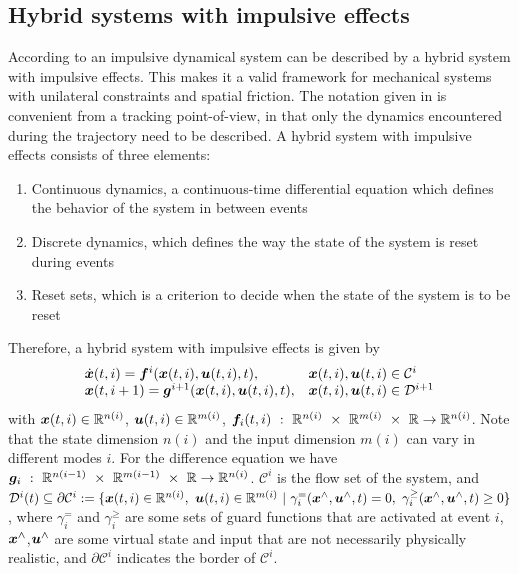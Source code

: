 \documentclass[../DC2017114Bouma.tex]{subfiles}
\begin{document}
%
\subsection{Hybrid systems with impulsive effects}\label{sec:2hyb}
According to \cite{Haddad2006} an impulsive dynamical system can be described by a hybrid system with impulsive effects. This makes it a valid framework for mechanical systems with unilateral constraints and spatial friction. The notation given in \cite{Haddad2006} is convenient from a tracking point-of-view, in that only the dynamics encountered during the trajectory need to be described. A hybrid system with impulsive effects consists of three elements:
\begin{enumerate}
\item Continuous dynamics, a continuous-time differential equation which defines the behavior of the system in between events
\item Discrete dynamics, which defines the way the state of the system is reset during events
\item Reset sets, which is a criterion to decide when the state of the system is to be reset
\end{enumerate}

Therefore, a hybrid system with impulsive effects is given by
\begin{equation}
\begin{array}{ll}
\dot{{\boldsymbol{x}}}(t,i) ={\boldsymbol{f}}^i({\boldsymbol{x}}(t,i),{\boldsymbol{u}}(t,i),t),& {\boldsymbol{x}}(t,i),{\boldsymbol{u}}(t,i)\in \mathcal{C}^i\\
{\boldsymbol{x}}(t,i+1) = {\boldsymbol{g}}^{i+1}({\boldsymbol{x}}(t,i),{\boldsymbol{u}}(t,i),t),& {\boldsymbol{x}}(t,i),{\boldsymbol{u}}(t,i)\in \mathcal{D}^{i+1}
\end{array}\label{eq:hybimp}
\end{equation}
%
%
%
%
%
%
%
with ${\boldsymbol{x}}(t,i)\in\mathbb{R}^{n(i)}$, ${\boldsymbol{u}}(t,i)\in\mathbb{R}^{m(i)}$, $\fb_i(t,i)\ :\ \Rbb^{n(i)}\ \times\ \Rbb^{m(i)}\ \times\ \Rbb\rightarrow \Rbb^{n(i)}$. Note that the state dimension $n(i)$ and the input dimension $m(i)$ can vary in different modes $i$. For the difference equation we have $\gb_i\ :\ \Rbb^{n(i-1)}\ \times\ \Rbb^{m(i-1)}\ \times\ \Rbb\rightarrow \Rbb^{n(i)}$. $\mathcal{C}^i$ is the flow set of the system, and $\mathcal{D}^i(t) \subseteq \partial \mathcal{C}^i := \{\xb(t,i)\in\Rbb^{n(i)},\ \ub(t,i)\in\Rbb^{m(i)}\ |\ \gamma^{=}_i(\xb^{\wedge},\ub^{\wedge},t) = 0, \ \gamma^{\geq}_i(\xb^{\wedge},\ub^{\wedge},t) \geq 0\}$, where $\gamma^{=}_i$ and $\gamma^{\geq}_i$ are some sets of guard functions that are activated at event $i$, ${\boldsymbol{x}}^{\wedge}$,${\boldsymbol{u}}^{\wedge}$ are some virtual state and input that are not necessarily physically realistic, and $\partial \mathcal{C}^i$ indicates the border of $\mathcal{C}^i$.
\end{document}

